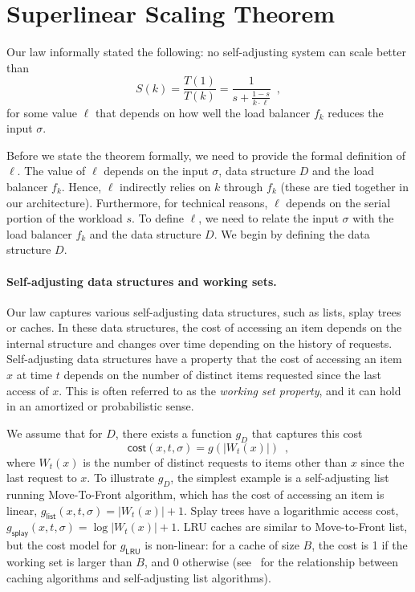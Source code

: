 \appendix





\section{Superlinear Scaling Theorem}
\label{sec:apx}

Our law informally stated the following: no self-adjusting system can scale better than
\begin{equation*}
  S(k) = \frac{T(1)}{T(k)} = \frac1{s + \frac{1-s}{k \cdot \ell}} \enspace ,
\end{equation*}
for some value $\ell$ that depends on how well the load balancer $f_k$ reduces the input $\sigma$.

Before we state the theorem formally, we need to provide the formal definition of $\ell$.
The value of $\ell$ depends on the input $\sigma$, data structure $D$ and the load balancer $f_k$. Hence, $\ell$ indirectly relies on $k$ through $f_k$ (these are tied together in our architecture). Furthermore, for technical reasons, $\ell$ depends on the serial portion of the workload $s$.
To define $\ell$, we need to relate the input $\sigma$ with the load balancer $f_k$ and the data structure $D$.
We begin by defining the data structure $D$.



\paragraph*{Self-adjusting data structures and working sets.}
Our law captures various self-adjusting data structures, such as lists, splay trees or caches.
In these data structures, the cost of accessing an item depends on the internal structure and changes over time depending on the history of requests.
Self-adjusting data structures have a property that the cost of accessing an item $x$ at time $t$ depends on the number of distinct items requested since the last access of $x$.
This is often referred to as the \emph{working set property}, and it can hold in an amortized or probabilistic sense.

We assume that for $D$, there exists a function $g_D$ that captures this cost
\[
	\textsf{cost}(x, t, \sigma) = g(|W_t(x)|) \enspace ,
\]
where $W_t(x)$ is the number of distinct requests to items other than $x$ since the last request to $x$.
To illustrate $g_D$, the simplest example is a self-adjusting list running Move-To-Front algorithm, which has the cost of accessing an item is linear, $g_\textsf{list}(x,t,\sigma) = |W_t(x)| + 1$. Splay trees have a logarithmic access cost, $g_\textsf{splay}(x,t,\sigma) = \log |W_t(x)| + 1$. LRU caches are similar to Move-to-Front list, but the cost model for $g_\textsf{LRU}$ is non-linear: for a cache of size $B$, the cost is 1 if the working set is larger than $B$, and 0 otherwise (see~\cite{SleatorT85} for the relationship between caching algorithms and self-adjusting list algorithms).

